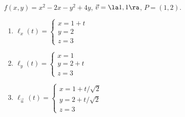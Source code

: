 {$f(x,y) = x^2-2x-y^2+4y$,  $\vec v = \la 1,1\ra$, $P=(1,2)$.\label{12_06_ex_08a}
}
{
\begin{enumerate}
	\item $\ell_x(t) = \left\{\begin{array}{l} x = 1+t\\ y = 2 \\ z = 3 \end{array} \right.$ 
	
	\item $\ell_y(t) = \left\{\begin{array}{l} x = 1\\ y = 2+t\\ z = 3 \end{array} \right.$
	
	\item $\ell_{\vec u\,}(t) = \left\{\begin{array}{l} x = 1+t/\sqrt{2}\\ y = 2+t/\sqrt{2} \\ z = 3 \end{array} \right.$
\end{enumerate}
}